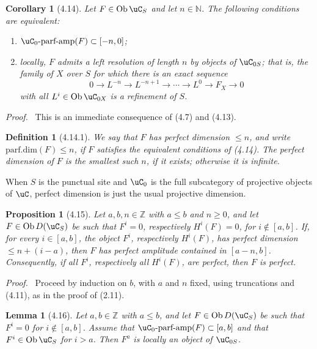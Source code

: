 \documentclass[11pt]{article}
\theoremstyle{plain}
\newtheorem*{proposition*}{Proposition}
\newtheorem*{lemma*}{Lemma}
\newtheorem*{corollary*}{Corollary}
\newtheorem*{definition*}{Definition}
\theoremstyle{definition}
\theoremstyle{remark}
\newenvironment{prooftext}{\par\noindent\textit{Proof.}\ }{\par\medskip}
\newcommand{\NN}{\mathbb N}
\newcommand{\ZZ}{\mathbb Z}
\DeclareMathOperator{\ob}{Ob}
\begin{document}
\begin{corollary*}[4.14]
Let $F\in\ob\uC_S$ and let $n\in\NN$. The following conditions are equivalent:
\begin{enumerate}[label=(\roman*)]
\item $\uC_0\text{-parf-amp}(F)\subset[-n,0]$;
\item locally, $F$ admits a left resolution of length $n$ by objects of $\uC_{0S}$; that is, the family of $X$ over $S$ for which there is an exact sequence
\[
0\longrightarrow L^{-n}\longrightarrow L^{-n+1}\longrightarrow\cdots\longrightarrow L^0\longrightarrow F_X\longrightarrow0
\]
with all $L^i\in\ob\uC_{0X}$ is a refinement of $S$.
\end{enumerate}
\end{corollary*}

\begin{prooftext}
This is an immediate consequence of (4.7) and (4.13).
\end{prooftext}

\begin{definition*}[4.14.1]
We say that $F$ has \emph{perfect dimension} $\leq n$, and write $\mathrm{parf.dim}(F)\leq n$, if $F$ satisfies the equivalent conditions of (4.14). The perfect dimension of $F$ is the smallest such $n$, if it exists; otherwise it is infinite.
\end{definition*}

When $S$ is the punctual site and $\uC_0$ is the full subcategory of projective objects of $\uC$, perfect dimension is just the usual projective dimension.

\begin{proposition*}[4.15]
Let $a,b,n\in\ZZ$ with $a\leq b$ and $n\geq0$, and let $F\in\ob D(\uC_S)$ be such that $F^i=0$, respectively $H^i(F)=0$, for $i\notin[a,b]$. If, for every $i\in[a,b]$, the object $F^i$, respectively $H^i(F)$, has perfect dimension $\leq n+(i-a)$, then $F$ has perfect amplitude contained in $[a-n,b]$. Consequently, if all $F^i$, respectively all $H^i(F)$, are perfect, then $F$ is perfect.
\end{proposition*}

\begin{prooftext}
Proceed by induction on $b$, with $a$ and $n$ fixed, using truncations and (4.11), as in the proof of (2.11).
\end{prooftext}

\begin{lemma*}[4.16]
Let $a,b\in\ZZ$ with $a\leq b$, and let $F\in\ob D(\uC_S)$ be such that $F^i=0$ for $i\notin[a,b]$. Assume that $\uC_0\text{-parf-amp}(F)\subset[a,b]$ and that $F^i\in\ob\uC_S$ for $i>a$. Then $F^a$ is locally an object of $\uC_{0S}$.
\end{lemma*}
\end{document}
